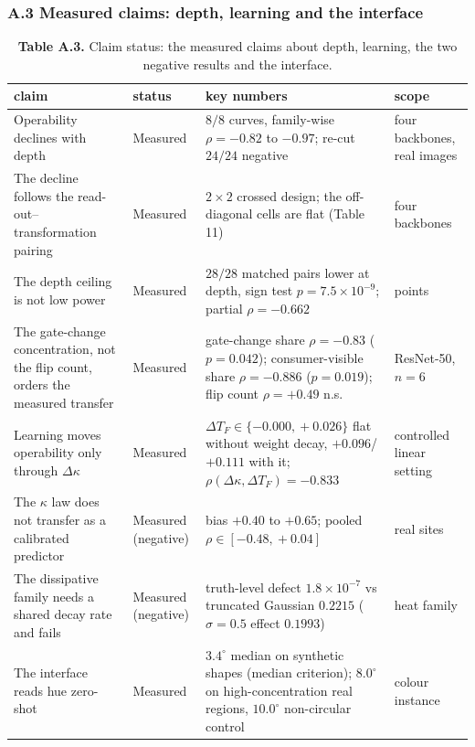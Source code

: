 \subsubsection*{A.3 Measured claims: depth, learning and the interface}


\begin{table}[t]
\centering
\small
\caption*{\textbf{Table A.3.} Claim status: the measured claims about depth, learning, the two negative results and the interface.}
\begin{tabularx}{\textwidth}{@{}>{\raggedright\arraybackslash}X >{\raggedright\arraybackslash}X >{\raggedright\arraybackslash}X >{\raggedright\arraybackslash}X@{}}
\toprule
\textbf{claim} & \textbf{status} & \textbf{key numbers} & \textbf{scope} \\
\midrule
Operability declines with depth & Measured & $8/8$ curves, family-wise $\rho=-0.82$ to $-0.97$; re-cut $24/24$ negative & four backbones, real images \\
The decline follows the read-out--transformation pairing & Measured & $2\times2$ crossed design; the off-diagonal cells are flat (Table 11) & four backbones \\
The depth ceiling is not low power & Measured & $28/28$ matched pairs lower at depth, sign test $p=7.5\times10^{-9}$; partial $\rho=-0.662$ & 98 points \\
The gate-change concentration, not the flip count, orders the measured transfer & Measured & gate-change share $\rho=-0.83$ ($p=0.042$); consumer-visible share $\rho=-0.886$ ($p=0.019$); flip count $\rho=+0.49$ n.s. & ResNet-50, $n=6$ \\
Learning moves operability only through $\Delta\kappa$ & Measured & $\Delta T_F\in\{-0.000,\allowbreak{}+0.026\}$ flat without weight decay, $+0.096$/$+0.111$ with it; $\rho(\Delta\kappa,\allowbreak{}\Delta T_F)=-0.833$ & controlled linear setting \\
The $\kappa$ law does not transfer as a calibrated predictor & Measured (negative) & bias $+0.40$ to $+0.65$; pooled $\rho\in[-0.48,\allowbreak{}+0.04]$ & 42 real sites \\
The dissipative family needs a shared decay rate and fails & Measured (negative) & truth-level defect $1.8\times10^{-7}$ vs truncated Gaussian $0.2215$ ($\sigma=0.5$ effect $0.1993$) & heat family \\
The interface reads hue zero-shot & Measured & $3.4^\circ$ median on synthetic shapes (median criterion); $8.0^\circ$ on high-concentration real regions, $10.0^\circ$ non-circular control & colour instance \\

\end{tabularx}
\end{table}
